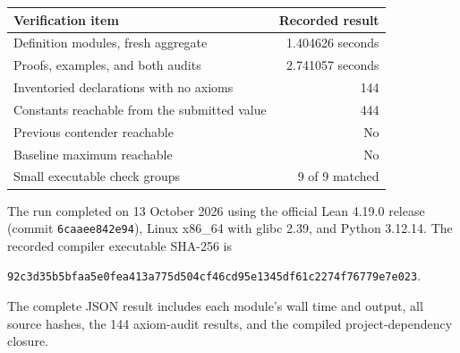 \begin{center}
\begin{tabular}{@{}lr@{}}
\toprule
Verification item & Recorded result\\
\midrule
Definition modules, fresh aggregate & 1.404626 seconds\\
Proofs, examples, and both audits & 2.741057 seconds\\
Inventoried declarations with no axioms & 144\\
Constants reachable from the submitted value & 444\\
Previous contender reachable & No\\
Baseline maximum reachable & No\\
Small executable check groups & 9 of 9 matched\\
\bottomrule
\end{tabular}
\end{center}
The run completed on 13 October 2026 using the official Lean 4.19.0
release (commit \texttt{6caaee842e94}), Linux x86\_64 with glibc 2.39,
and Python 3.12.14. The recorded compiler executable SHA-256 is
\begin{center}
\scriptsize\texttt{92c3d35b5bfaa5e0fea413a775d504cf46cd95e1345df61c2274f76779e7e023}.
\end{center}
The complete JSON result includes each module's wall time and output,
all source hashes, the 144 axiom-audit results, and the compiled
project-dependency closure.
